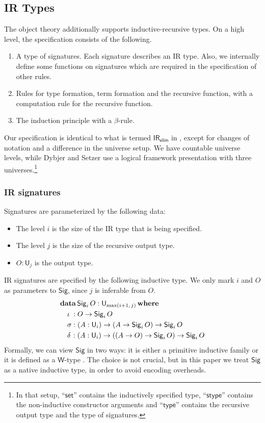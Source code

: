 \documentclass[acmsmall,screen,review]{acmart}
\newcommand{\msf}[1]{{\mathsf{#1}}}
\newcommand{\mbf}[1]{{\mathbf{#1}}}
\newcommand{\data}{\mbf{data}}
\newcommand{\U}{\msf{U}}
\newcommand{\where}{\mbf{where}}
\newcommand{\Sig}{\msf{Sig}}
\newcommand{\IR}{\msf{IR}}
\begin{document}
\subsection{IR Types}\label{sec:ir-specification}
The object theory additionally supports inductive-recursive types. On a high level, the
specification consists of the following.
\begin{enumerate}
\item A type of signatures. Each signature describes an IR type. Also, we internally define some
  functions on signatures which are required in the specification of other rules.
\item Rules for type formation, term formation and the recursive function, with a computation rule
  for the recursive function.
\item The induction principle with a $\beta$-rule.
\end{enumerate}

Our specification is identical to what is termed $\mbf{\IR_{\msf{elim}}}$ in
\cite{DBLP:journals/apal/DybjerS03}, except for changes of notation and a difference in the universe
setup. We have countable universe levels, while Dybjer and Setzer use a logical framework
presentation with three universes.\footnote{In that setup, ``$\msf{set}$'' contains the
inductively specified type, ``$\msf{stype}$'' contains the non-inductive constructor arguments and
``$\msf{type}$'' contains the recursive output type and the type of signatures.}

\subsubsection{IR signatures}\label{sec:ir-signatures}
Signatures are parameterized by the following data:
\begin{itemize}
\item The level $i$ is the size of the IR type that is being specified.
\item The level $j$ is the size of the recursive output type.
\item $O : \U_j$ is the output type.
\end{itemize}
IR signatures are specified by the following inductive type. We only mark $i$ and $O$ as parameters to $\Sig$,
since $j$ is inferable from $O$.
\begin{alignat*}{4}
  &\data\, \Sig_i\,O : \U_{\max(i+1,\,j)}\,\where\\
  &\quad \iota\hspace{0.25em}  : O \to \Sig_i\,O \\
  &\quad \sigma               : (A : \U_i) \to (A \to \Sig_i\,O) \to \Sig_i\,O \\
  &\quad \delta\hspace{0.1em} : (A : \U_i) \to ((A \to O) \to \Sig_i\,O) \to \Sig_i\,O
\end{alignat*}
Formally, we can view $\Sig$ in two ways: it is either a primitive inductive family \cite{inductivefamilies} or
it is defined as a $\msf{W}$-type \cite{whynotw}. The choice is not crucial, but in this paper
we treat $\Sig$ as a native inductive type, in order to avoid encoding overheads.
\end{document}
